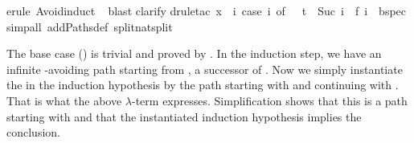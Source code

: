 \begin{isabellebody}
\isamarkupfalse%
erule\ Avoid{\isachardot}induct{\isacharparenright}\isanewline
\ \isamarkupfalse%
blast{\isacharparenright}\isanewline
\isamarkupfalse%
clarify{\isacharparenright}\isanewline
\isamarkupfalse%
drule{\isacharunderscore}tac\ x\ {\isacharequal}\ {\isachardoublequote}{\isasymlambda}i{\isachardot}\ case\ i\ of\ {}\ {\isasymRightarrow}\ t\ {\isacharbar}\ Suc\ i\ {\isasymRightarrow}\ f\ i{\isachardoublequote}\ \ bspec{\isacharparenright}\isanewline
\isamarkupfalse%
simp{\isacharunderscore}all\ add{\isacharcolon}Paths{\isacharunderscore}def\ split{\isacharcolon}nat{\isachardot}split{\isacharparenright}\isanewline
\isamarkupfalse%
\isamarkupfalse%
%
\begin{isamarkuptext}%
\noindent
The base case () is trivial and proved by .
In the induction step, we have an infinite -avoiding path 
starting from , a successor of . Now we simply instantiate
the  in the induction hypothesis by the path starting with
 and continuing with . That is what the above $\lambda$-term
expresses.  Simplification shows that this is a path starting with  
and that the instantiated induction hypothesis implies the conclusion.


\end{isamarkuptext}
\end{isabellebody}
